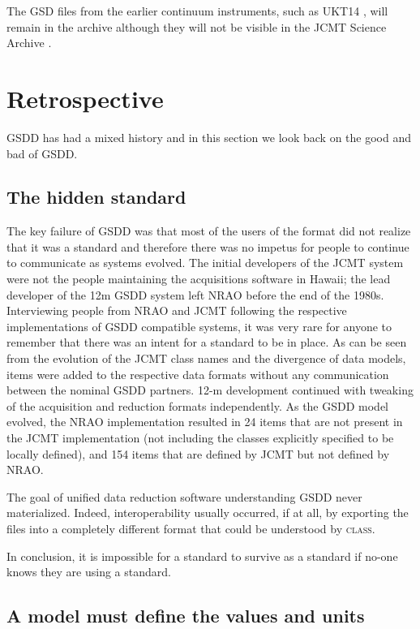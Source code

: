 \documentclass[final,authoryear,5p,times,twocolumn]{elsarticle}
\begin{document}
The GSD files from the earlier continuum instruments, such as UKT14
\citep{1990MNRAS.243..126D}, will remain in the archive although they
will not be visible in the JCMT Science Archive \citep{2015Economou}.


\section{Retrospective}

GSDD has had a mixed history and in this section we look back on the
good and bad of GSDD.

\subsection{The hidden standard}

The key failure of GSDD was that most of the users of the format did
not realize that it was a standard and therefore there was no
impetus for people to continue to communicate as systems
evolved. The initial developers of the JCMT system were not the people
maintaining the acquisitions software in Hawaii; the lead developer of
the 12m GSDD system left NRAO before the end of the 1980s.
Interviewing people from NRAO and JCMT following the
respective implementations of GSDD compatible systems, it was very rare
for anyone to remember that there was an intent for a standard to be
in place. As can be seen from the evolution of the JCMT class names
and the divergence of data models, items were added to the respective
data formats without any communication between the nominal GSDD
partners. 12-m development continued with tweaking of the acquisition
and reduction formats independently.  As the GSDD model evolved, the
NRAO implementation resulted in 24 items that are not present in the
JCMT implementation (not including the classes explicitly specified to
be locally defined), and 154 items that are defined by JCMT but not
defined by NRAO.

The goal of unified data reduction software understanding GSDD never
materialized. Indeed, interoperability usually occurred, if at all, by exporting
the files into a completely different format that could be understood
by \textsc{class}.

In conclusion, it is impossible for a standard to survive as a standard
if no-one knows they are using a standard.

\subsection{A model must define the values and units}
\end{document}
